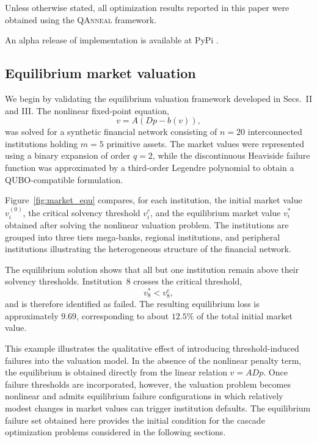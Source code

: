 \documentclass[aps,reprint,superscriptaddress,pra]{revtex4-2}
\begin{document}
Unless otherwise stated, all optimization results reported in this paper were
obtained using the \textsc{QAnneal} framework.

An alpha release of implementation is available at PyPi \cite{qanneal2026}. 

\subsection{Equilibrium market valuation}

We begin by validating the equilibrium valuation framework developed in Secs.~II and III. The nonlinear fixed-point equation,
\begin{equation}
v=A\left(Dp-b(v)\right),
\end{equation}
was solved for a synthetic financial network consisting of $n=20$ interconnected institutions holding $m=5$ primitive assets. The market values were represented using a binary expansion of order $q=2$, while the discontinuous Heaviside failure function was approximated by a third-order Legendre polynomial to obtain a QUBO-compatible formulation.

Figure~\ref{fig:market_equ} compares, for each institution, the initial market value $v_i^{(0)}$, the critical solvency threshold $v_i^c$, and the equilibrium market value $v_i^{*}$ obtained after solving the nonlinear valuation problem. The institutions are grouped into three tiers mega-banks, regional institutions, and peripheral institutions illustrating the heterogeneous structure of the financial network.

The equilibrium solution shows that all but one institution remain above their solvency thresholds. Institution~8 crosses the critical threshold,
\begin{equation}
v_8^{*}<v_8^{c},
\end{equation}
and is therefore identified as failed. The resulting equilibrium loss is approximately $9.69$, corresponding to about $12.5\%$ of the total initial market value.

This example illustrates the qualitative effect of introducing threshold-induced failures into the valuation model. In the absence of the nonlinear penalty term, the equilibrium is obtained directly from the linear relation $v=ADp$. Once failure thresholds are incorporated, however, the valuation problem becomes nonlinear and admits equilibrium failure configurations in which relatively modest changes in market values can trigger institution defaults. The equilibrium failure set obtained here provides the initial condition for the cascade optimization problems considered in the following sections.
\end{document}
